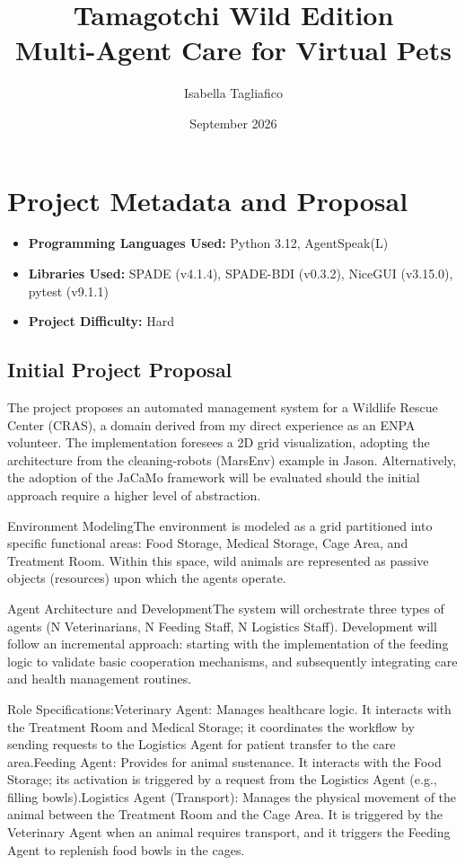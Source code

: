 \documentclass{article}
\title{Tamagotchi Wild Edition \\ Multi-Agent Care for Virtual Pets}
\author{Isabella Tagliafico}
\date{September 2026}
\renewcommand{\_}{\oldtextunderscore\allowbreak}
\begin{document}
\maketitle

\section*{Project Metadata and Proposal}

\begin{itemize}
    \item \textbf{Programming Languages Used:} Python 3.12, AgentSpeak(L)
    \item \textbf{Libraries Used:} SPADE (v4.1.4), SPADE-BDI (v0.3.2), NiceGUI (v3.15.0), pytest (v9.1.1)
    \item \textbf{Project Difficulty:} Hard
\end{itemize}

\subsection*{Initial Project Proposal}
The project proposes an automated management system for a Wildlife Rescue Center (CRAS), a domain derived from my direct experience as an ENPA volunteer.
The implementation foresees a 2D grid visualization, adopting the architecture from the cleaning-robots (MarsEnv) example in Jason. 
Alternatively, the adoption of the JaCaMo framework will be evaluated should the initial approach require a higher level of abstraction.

Environment ModelingThe environment is modeled as a grid partitioned into specific functional areas: Food Storage, Medical Storage, Cage Area, and Treatment Room. Within this space, wild animals are represented as passive objects (resources) upon which the agents operate.

Agent Architecture and DevelopmentThe system will orchestrate three types of agents (N Veterinarians, N Feeding Staff, N Logistics Staff).
Development will follow an incremental approach: starting with the implementation of the feeding logic to validate basic cooperation mechanisms, and subsequently integrating care and health management routines.

Role Specifications:Veterinary Agent: Manages healthcare logic. 
It interacts with the Treatment Room and Medical Storage; it coordinates the workflow by sending requests to the Logistics Agent for patient transfer to the care area.Feeding Agent: Provides for animal sustenance. It interacts with the Food Storage; its activation is triggered by a request from the Logistics Agent (e.g., filling bowls).Logistics Agent (Transport): Manages the physical movement of the animal between the Treatment Room and the Cage Area. It is triggered by the Veterinary Agent when an animal requires transport, and it triggers the Feeding Agent to replenish food bowls in the cages.
\end{document}
